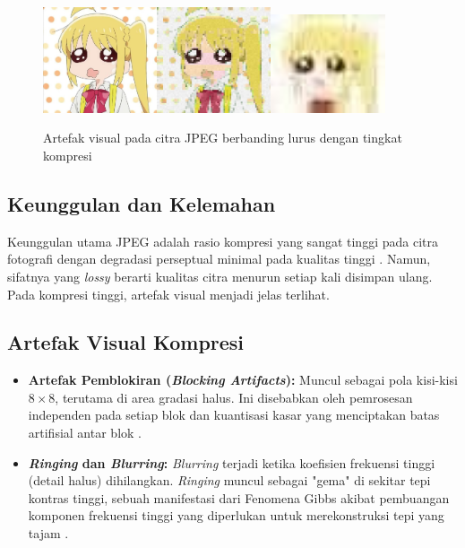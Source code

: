 \documentclass[a4paper]{article}
\begin{document}
\begin{figure}[h]
  \centering
  \includegraphics[width=0.3\textwidth]{img/nijika1.jpg}\qquad\includegraphics[width=0.3\textwidth]{img/nijika2.jpg}\qquad\includegraphics[width=0.3\textwidth]{img/nijika3.jpg}
  \caption{Artefak visual pada citra JPEG berbanding lurus dengan tingkat kompresi}
\end{figure}

\subsection{Keunggulan dan Kelemahan}
Keunggulan utama JPEG adalah rasio kompresi yang sangat tinggi pada citra fotografi dengan degradasi perseptual minimal pada kualitas tinggi \cite{wallace1991jpeg}. Namun, sifatnya yang \textit{lossy} berarti kualitas citra menurun setiap kali disimpan ulang. Pada kompresi tinggi, artefak visual menjadi jelas terlihat.

\subsection{Artefak Visual Kompresi}
\begin{itemize}
  \item \textbf{Artefak Pemblokiran (\textit{Blocking Artifacts}):} Muncul sebagai pola kisi-kisi $8\times 8$, terutama di area gradasi halus. Ini disebabkan oleh pemrosesan independen pada setiap blok dan kuantisasi kasar yang menciptakan batas artifisial antar blok \cite{singh2012blocking, chou1998smoothing}.
  \item \textbf{\textit{Ringing} dan \textit{Blurring}:} \textit{Blurring} terjadi ketika koefisien frekuensi tinggi (detail halus) dihilangkan. \textit{Ringing} muncul sebagai "gema" di sekitar tepi kontras tinggi, sebuah manifestasi dari Fenomena Gibbs akibat pembuangan komponen frekuensi tinggi yang diperlukan untuk merekonstruksi tepi yang tajam \cite{gottlieb1996gibbs, marziliano2004perceptual}.
\end{itemize}
\end{document}
